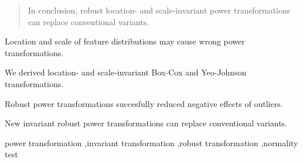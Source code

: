 \documentclass[preprint,12pt,authoryear]{elsarticle}
\begin{document}
\begin{frontmatter}
\begin{abstract}
In conclusion, robust location- and scale-invariant power
transformations can replace conventional variants.
\end{abstract}


%
%

\begin{highlights}
\item Location and scale of feature distributions may cause wrong power transformations.
\item We derived location- and scale-invariant Box-Cox and Yeo-Johnson transformations.
\item Robust power transformations succesfully reduced negative effects of outliers.
\item New invariant robust power transformations can replace conventional variants.
\end{highlights}

\begin{keyword}

power transformation \sep invariant transformation \sep robust transformation \sep normality test



\end{keyword}

\end{frontmatter}
\end{document}
